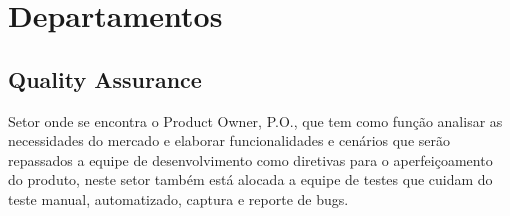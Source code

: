 \documentclass[
    article,            %
    11pt,               %
    oneside,            %
    a4paper,            %
    english,            %
    brazil,             %
    sumario=tradicional
    ]{abntex2}
\begin{document}
\frenchspacing 


%
%
\maketitle

 


\textual

\section{Departamentos}

\subsection{Quality Assurance }

Setor onde se encontra o Product Owner, P.O., que tem como função analisar as necessidades do mercado e elaborar funcionalidades e cenários que serão repassados a equipe de desenvolvimento como diretivas para o aperfeiçoamento do produto, neste setor também está alocada a equipe de testes que cuidam do teste manual, automatizado, captura e reporte de bugs.
\end{document}
